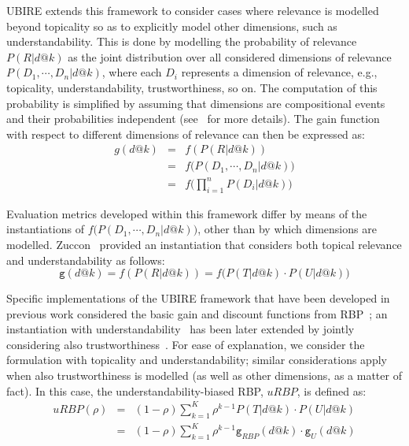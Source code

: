 UBIRE extends this framework to consider cases where relevance is modelled beyond topicality so as to explicitly model other dimensions, such as understandability.
This is done by modelling the probability of relevance $P(R|d@k)$ as the joint distribution over all considered dimensions of relevance $P(D_1, \cdots, D_n|d@k)$, where each $D_i$ represents a dimension of relevance, e.g., topicality, understandability, trustworthiness, so on. The computation of this probability is simplified by assuming that dimensions are compositional events and their probabilities independent (see~\cite{zuccon16} for more details). The gain function with respect to different dimensions of relevance can then be expressed as:
%
\begin{eqnarray}
    g(d@k) &=& f(P(R|d@k)) \\
    &=& f\big(P(D_1, \cdots, D_n|d@k)\big) \\
    &=& f\Big(\prod_{i=1}^n P(D_i|d@k)\Big) 
\end{eqnarray}
%

Evaluation metrics developed within this framework differ by means of the instantiations of $f\big(P(D_1, \cdots, D_n|d@k)\big)$, other than by which dimensions are modelled. Zuccon~\cite{zuccon16} provided an instantiation that considers both topical relevance and understandability as follows:
%
\begin{equation}
\mathtt{g}(d@k) = f(P(R|d@k)) = f\big(P(T|d@k) \cdot P(U|d@k)\big)
\end{equation}
%

Specific implementations of the UBIRE framework that have been developed in previous work considered the basic gain and discount functions from RBP~\cite{moffat08}; an instantiation with understandability~\cite{zuccon14,zuccon16} has been later extended by jointly considering also trustworthiness~\cite{clef17}. For ease of explanation, we consider the formulation with topicality and understandability; similar considerations apply when also trustworthiness is modelled (as well as other dimensions, as a matter of fact). In this case, the understandability-biased RBP, $uRBP$, is defined as: 
%
\begin{eqnarray}
    uRBP(\rho) &=& (1-\rho) \sum_{k=1}^{K} \rho^{k-1} P(T|d@k) \cdot P(U|d@k)\\ 
&=& (1-\rho) \sum_{k=1}^{K} \rho^{k-1} \mathtt{g}_{RBP}(d@k) \cdot \mathtt{g}_{U}(d@k)
\label{eq:RBP}
\end{eqnarray}


